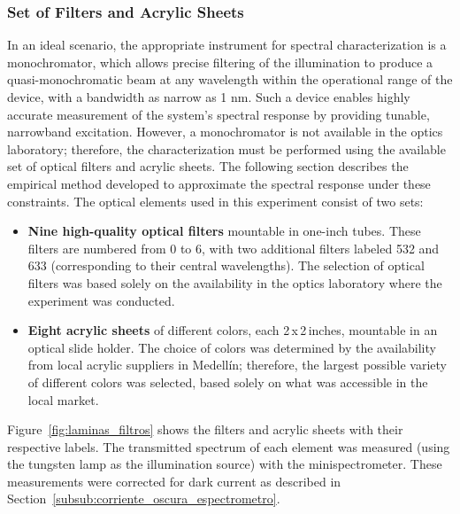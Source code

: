 \subsubsection{Set of Filters and Acrylic Sheets}
\label{subsub:filtros_laminas}

In an ideal scenario, the appropriate instrument for spectral characterization is a monochromator, which allows precise filtering of the illumination to produce a quasi-monochromatic beam at any wavelength within the operational range of the device, with a bandwidth as narrow as 1 nm. Such a device enables highly accurate measurement of the system's spectral response by providing tunable, narrowband excitation. However, a monochromator is not available in the optics laboratory; therefore, the characterization must be performed using the available set of optical filters and acrylic sheets. The following section describes the empirical method developed to approximate the spectral response under these constraints.
\noindent The optical elements used in this experiment consist of two sets:
\begin{itemize}
    \item \textbf{Nine high-quality optical filters} mountable in one-inch tubes. These filters are numbered from 0 to 6, with two additional filters labeled 532 and 633 (corresponding to their central wavelengths). The selection of optical filters was based solely on the availability in the optics laboratory where the experiment was conducted.
    
    \item \textbf{Eight acrylic sheets} of different colors, each 2\,x\,2\,inches, mountable in an optical slide holder. The choice of colors was determined by the availability from local acrylic suppliers in Medellín; therefore, the largest possible variety of different colors was selected, based solely on what was accessible in the local market.
\end{itemize}

\noindent Figure~\ref{fig:laminas_filtros} shows the filters and acrylic sheets with their respective labels. The transmitted spectrum of each element was measured (using the tungsten lamp as the illumination source) with the minispectrometer. These measurements were corrected for dark current as described in Section~\ref{subsub:corriente_oscura_espectrometro}.

